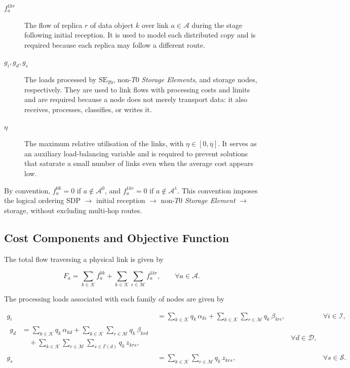 \documentclass[a4paper,fleqn]{cas-dc}
\newcommand{\A}{\mathcal{A}}
\newcommand{\Iset}{\mathcal{I}}
\newcommand{\Dset}{\mathcal{D}}
\newcommand{\Sset}{\mathcal{S}}
\newcommand{\Kset}{\mathcal{K}}
\newcommand{\Mset}{\mathcal{M}}
\newcommand{\Apre}{\mathcal{A}^{0}}
\newcommand{\Apost}{\mathcal{A}^{1}}
\begin{document}
\begin{description}
\item[\(f_a^{1kr}\)] The flow of replica \(r\) of data object \(k\) over link \(a\in\A\) during the stage following initial reception. It is used to model each distributed copy and is required because each replica may follow a different route. 

\item[\(g_i,g_d,g_s\)] The loads processed by \(\mathrm{SE}_{T0}\), non-\(T0\) \emph{Storage Elements}, and storage nodes, respectively. They are used to link flows with processing costs and limits and are required because a node does not merely transport data: it also receives, processes, classifies, or writes it. 

\item[\(\eta\)] The maximum relative utilisation of the links, with \(\eta\in[0,\overline\eta]\). It serves as an auxiliary load-balancing variable and is required to prevent solutions that saturate a small number of links even when the average cost appears low.

\end{description}

By convention, \(f_a^{0k}=0\) if \(a\notin\Apre\), and \(f_a^{1kr}=0\) if \(a\notin\Apost\). This convention imposes the logical ordering SDP \(\to\) initial reception \(\to\) non-\(T0\) \emph{Storage Element} \(\to\) storage, without excluding multi-hop routes.



\subsection{Cost Components and Objective Function}

The total flow traversing a physical link is given by

\begin{equation}
F_a = \sum_{k\in\Kset} f_a^{0k} + \sum_{k\in\Kset}\sum_{r\in\Mset} f_a^{1kr},
\qquad \forall a\in\A.
\end{equation}

The processing loads associated with each family of nodes are given by


\begin{align}
g_i &= \sum_{k\in\Kset} q_k\,\alpha_{ki}
      + \sum_{k\in\Kset}\sum_{r\in\Mset} q_k\,\beta_{kri},
       &&\forall i\in\Iset,\\[1ex]
\begin{split}
g_d &= \sum_{k\in\Kset} q_k\,\alpha_{kd}
      + \sum_{k\in\Kset}\sum_{r\in\Mset} q_k\,\beta_{krd} \\
    &\quad + \sum_{k\in\Kset}\sum_{r\in\Mset}\sum_{s\in\Gamma(d)} q_k\,z_{krs},
\end{split}
       && \forall d\in\Dset,\\[1ex]
g_s &= \sum_{k\in\Kset}\sum_{r\in\Mset} q_k\,z_{krs},
       &&\forall s\in\Sset.
\end{align}
\end{document}
